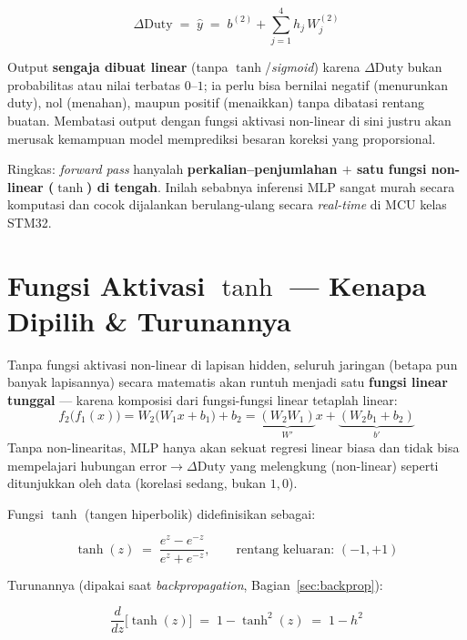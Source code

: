 \documentclass[11pt,a4paper]{article}
\begin{document}
\begin{formulabox}
\[
  \Delta\mathrm{Duty} \;=\; \hat{y} \;=\; b^{(2)} + \sum_{j=1}^{4} h_j \, W^{(2)}_j
\]
\end{formulabox}

Output \textbf{sengaja dibuat linear} (tanpa $\tanh$/\emph{sigmoid}) karena
$\Delta\mathrm{Duty}$ bukan probabilitas atau nilai terbatas $0$--$1$; ia perlu bisa
bernilai negatif (menurunkan duty), nol (menahan), maupun positif (menaikkan) tanpa
dibatasi rentang buatan. Membatasi output dengan fungsi aktivasi non-linear di sini justru
akan merusak kemampuan model memprediksi besaran koreksi yang proporsional.

\begin{verdictbox}
Ringkas: \emph{forward pass} hanyalah \textbf{perkalian--penjumlahan $+$ satu fungsi
non-linear ($\tanh$) di tengah}. Inilah sebabnya inferensi MLP sangat murah secara
komputasi dan cocok dijalankan berulang-ulang secara \emph{real-time} di MCU kelas STM32.
\end{verdictbox}

\section{Fungsi Aktivasi $\tanh$ --- Kenapa Dipilih \& Turunannya}
\label{sec:tanh}

Tanpa fungsi aktivasi non-linear di lapisan hidden, seluruh jaringan (betapa pun banyak
lapisannya) secara matematis akan runtuh menjadi satu \textbf{fungsi linear tunggal} ---
karena komposisi dari fungsi-fungsi linear tetaplah linear:
\[
  f_2\big(f_1(x)\big) = W_2\big(W_1 x + b_1\big) + b_2 = \underbrace{(W_2 W_1)}_{W'} x + \underbrace{(W_2 b_1 + b_2)}_{b'}
\]
Tanpa non-linearitas, MLP hanya akan sekuat regresi linear biasa dan tidak bisa
mempelajari hubungan $\mathrm{error}\to\Delta\mathrm{Duty}$ yang melengkung (non-linear)
seperti ditunjukkan oleh data (korelasi sedang, bukan $1{,}0$).

Fungsi $\tanh$ (tangen hiperbolik) didefinisikan sebagai:

\begin{formulabox}
\[
  \tanh(z) \;=\; \frac{e^{z}-e^{-z}}{e^{z}+e^{-z}}, \qquad \text{rentang keluaran: } (-1,+1)
\]
\end{formulabox}

Turunannya (dipakai saat \emph{backpropagation}, Bagian~\ref{sec:backprop}):

\begin{formulabox}
\[
  \frac{d}{dz}\big[\tanh(z)\big] \;=\; 1-\tanh^2(z) \;=\; 1-h^2
\]
\end{formulabox}
\end{document}
